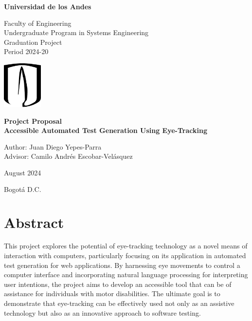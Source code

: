 \documentclass[letterpaper, 12pt]{article}
\date{}
\begin{document}
\begin{titlepage}
\centering
{\bfseries\LARGE Universidad de los Andes \par}
\vspace{1cm}
{\Large Faculty of Engineering \\ Undergraduate Program in Systems Engineering \\ Graduation Project \\ Period 2024-20\par}
\vspace{2.0cm}
\includegraphics[width=0.15\textwidth]{images/Uniandes.png}\par
\vspace{2.0cm}
{\bfseries \LARGE Project Proposal \\ Accessible Automated Test Generation Using Eye-Tracking \par}
\vspace{2.0cm}
\vfill

\vfill
Author: Juan Diego Yepes-Parra \\
Advisor: Camilo Andrés Escobar-Velásquez
\par
\vfill
{ August 2024 \par}
{ Bogotá D.C. \par}
\end{titlepage}

\tableofcontents
\pagebreak

\section{Abstract}

This project explores the potential of eye-tracking technology as a novel means of interaction with computers, particularly focusing on its application in automated test generation for web applications. By harnessing eye movements to control a computer interface and incorporating natural language processing for interpreting user intentions, the project aims to develop an accessible tool that can be of assistance for individuals with motor disabilities. The ultimate goal is to demonstrate that eye-tracking can be effectively used not only as an assistive technology but also as an innovative approach to software testing.
\newline
\end{document}
